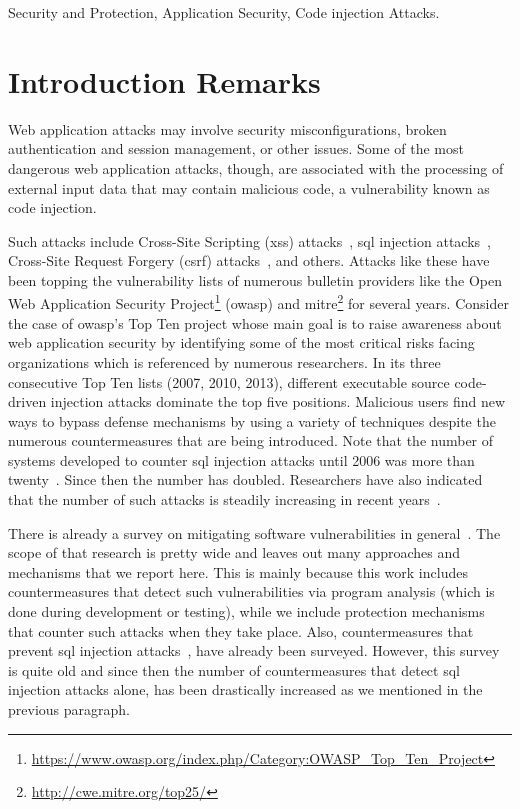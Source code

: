 \documentclass[conference]{IEEEtran}
\begin{document}
\begin{IEEEkeywords}
Security and Protection, Application Security, Code injection Attacks.
\end{IEEEkeywords}

\IEEEpeerreviewmaketitle

\section{Introduction Remarks}

Web application attacks may involve security misconfigurations,
broken authentication and session management, or other issues.
Some of the most dangerous web application attacks, though,
are associated with the processing of external input data
that may contain malicious code, a vulnerability known as
code injection.

Such attacks include Cross-Site Scripting ({\sc xss})
attacks~\cite{SG07}, {\sc sql} injection attacks~\cite{RL12b},
Cross-Site Request Forgery ({\sc csrf}) attacks~\cite{LZRL09}, and
others. Attacks like these have been topping the vulnerability lists
of numerous bulletin providers like the Open Web Application Security
Project\footnote{\url{https://www.owasp.org/index.php/Category:OWASP_Top_Ten_Project}}
({\sc owasp}) and
{\sc mitre}\footnote{\url{http://cwe.mitre.org/top25/}} for several
years. Consider the case of {\sc owasp}'s Top Ten project whose main
goal is to raise awareness about web application security by
identifying some of the most critical risks facing organizations which
is referenced by numerous researchers. In its three consecutive Top
Ten lists (2007, 2010, 2013), different executable source code-driven
injection attacks dominate the top five positions. Malicious users
find new ways to bypass defense mechanisms by using a variety of
techniques despite the numerous countermeasures that are being
introduced. Note that the number of systems developed to counter
{\sc sql} injection attacks until 2006 was more than twenty~\cite{HVO06}.
Since then the number has doubled.
Researchers have also indicated that the number of such attacks
is steadily increasing in recent years~\cite{SSL12}.

There is already a survey on mitigating
software vulnerabilities in general~\cite{SZ12}.
The scope of that research is pretty wide and leaves
out many approaches and mechanisms that we report here.
This is mainly because this work includes countermeasures
that detect such vulnerabilities via program analysis
(which is done during development or testing), while
we include protection mechanisms that counter
such attacks when they take place.
Also, countermeasures that prevent {\sc sql}
injection attacks~\cite{HVO06}, have already been surveyed.
However, this survey is quite old and since then
the number of countermeasures that detect {\sc sql}
injection attacks alone, has been drastically increased
as we mentioned in the previous paragraph.
\end{document}
